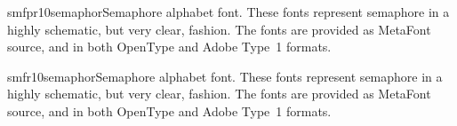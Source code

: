 \documentclass{ddltxtyp}
\begin{document}
\begin{package}{smfpr10}{semaphor}{Semaphore alphabet font.}
These fonts represent semaphore in a highly schematic, but very
clear, fashion. The fonts are provided as MetaFont source, and
in both OpenType and Adobe Type~1 formats.
\end{package}
\begin{package}{smfr10}{semaphor}{Semaphore alphabet font.}
These fonts represent semaphore in a highly schematic, but very
clear, fashion. The fonts are provided as MetaFont source, and
in both OpenType and Adobe Type~1 formats.
\end{package}

\end{document}
